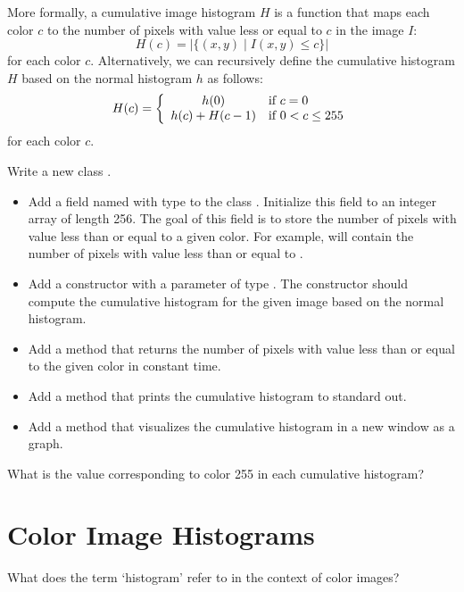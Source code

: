 \documentclass{book}
\begin{document}
More formally, a cumulative image histogram $H$ is a function that maps each color $c$ to the number of pixels with value less or equal to $c$ in the image $I$:
$$H(c) = |\{ (x, y) \mid I(x, y) \leq c \}|$$
for each color $c$. Alternatively, we can recursively define the cumulative histogram $H$ based on the normal histogram $h$ as follows:
$$H(c) = \left\{\begin{array}{c l}
  h(0) & \text{if $c = 0$}\\
  h(c) + H(c - 1) & \text{if $0 < c \leq 255$}\\
\end{array}
\right.$$
for each color $c$.

\begin{exercise}
Write a new class .
\begin{itemize}
  \item  Add a field named  with type  to the class . Initialize this field to an integer array of length 256. The goal of this field is to store the number of pixels with value less than or equal to a given color. For example,  will contain the number of pixels with value less than or equal to .
  \item Add a constructor with a parameter of type . The constructor should compute the cumulative histogram for the given image based on the normal histogram.
   \item Add a method  that returns the number of pixels with value less than or equal to the given color in constant time.
  \item Add a method  that prints the cumulative histogram to standard out. 
 \item Add a method  that visualizes the cumulative histogram in a new window as a graph.
\end{itemize}
\end{exercise}

\begin{exercise}
What is the value corresponding to color 255 in each cumulative histogram?  
\end{exercise}

\section{Color Image Histograms}
What does the term `histogram' refer to in the context of color images?
\end{document}

